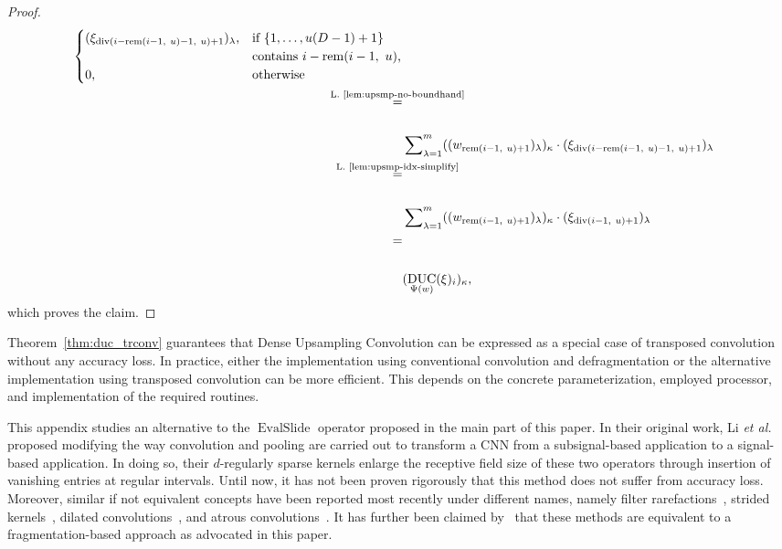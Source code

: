 \documentclass[journal]{IEEEtran}
\newcommand{\discint}[2]{\{#1,\dotsc,#2\}}
\DeclareMathOperator{\EvalSlide}{EvalSlide}
\renewcommand{\div}[2]{\operatorname{div}(#1,\ #2)}
\newcommand{\rem}[2]{\operatorname{rem}(#1,\ #2)}
\newcommand{\equsing}[1]{\overset{\mathclap{\text{#1}}}{=}}
\DeclareMathOperator{\DUC}{DUC}
\begin{document}
\begin{proof}
\begin{align*}
      \begin{cases}
          (\xi_{\div{i - \rem{i - 1}{u} - 1}{u} + 1})_\lambda\text{,} & \text{if }\discint{1}{u(D - 1) + 1} \\& \text{contains }i - \rem{i - 1}{u}\text{,}\\
          0\text{,} & \text{otherwise}
        \end{cases}\\
  \equsing{L.~\ref{lem:upsmp-no-boundhand}}\\\\& \sum\nolimits_{\lambda = 1}^m ((w_{\rem{i - 1}{u} + 1})_\lambda)_\kappa \cdot (\xi_{\div{i - \rem{i - 1}{u} - 1}{u} + 1})_\lambda\\
  \equsing{L.~\ref{lem:upsmp-idx-simplify}}\\\\& \sum\nolimits_{\lambda = 1}^m ((w_{\rem{i - 1}{u} + 1})_\lambda)_\kappa \cdot (\xi_{\div{i - 1}{u} + 1})_\lambda\\
  =\\\\& (\DUC_{\Psi(w)}(\xi)_i)_\kappa\text{,}
\end{align*}
which proves the claim.
\end{proof}

Theorem~\ref{thm:duc_trconv} guarantees that Dense Upsampling Convolution can be expressed as a special case of transposed convolution without any accuracy loss.
In practice, either the implementation using conventional convolution and defragmentation or the alternative implementation using transposed convolution can be more efficient.
This depends on the concrete parameterization, employed processor, and implementation of the required routines.

\clearpage
{}
This appendix studies an alternative to the $\EvalSlide$ operator proposed in the main part of this paper.
In their original work, Li \emph{et al.}~ proposed modifying the way convolution and pooling are carried out to transform a CNN from a subsignal-based application to a signal-based application.
In doing so, their $d$-regularly sparse kernels enlarge the receptive field size of these two operators through insertion of vanishing entries at regular intervals.
Until now, it has not been proven rigorously that this method does not suffer from accuracy loss.
Moreover, similar if not equivalent concepts have been reported most recently under different names, namely 
filter rarefactions~, strided kernels~, dilated convolutions~, and atrous convolutions~.
It has further been claimed by~ that these methods are equivalent to a fragmentation-based approach as advocated in this paper.
\end{document}

